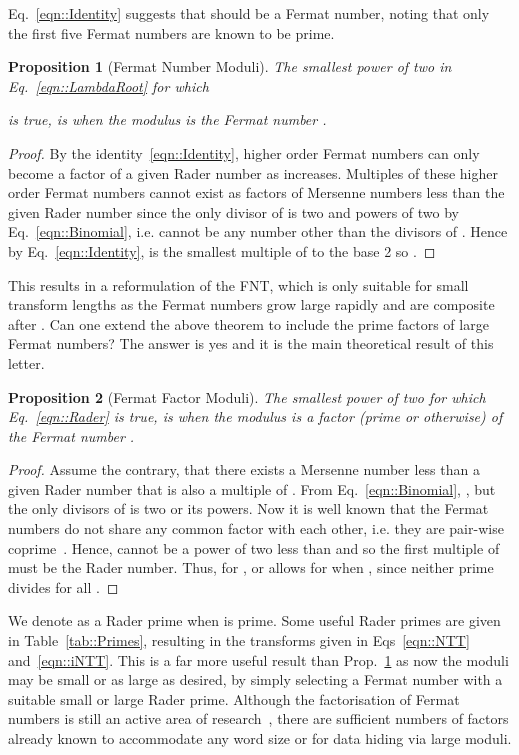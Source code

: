 \documentclass[twocolumn]{IEEEtran}
\newtheorem{theorem}{Proposition}
\newcommand{\eqnTag}{Eq.}
\newcommand{\eqnsTag}{Eqs}
\newcommand{\tabTag}{Table}
\newcommand{\propTag}{Prop.}
\begin{document}
\eqnTag~\eqref{eqn::Identity} suggests that  should be a Fermat number, noting that only the first five Fermat numbers are known to be prime.
\begin{theorem}[Fermat Number Moduli]\label{thm::FermatModuli}
The smallest power of two  in \eqnTag~\eqref{eqn::LambdaRoot} for which

is true, is when the modulus  is the Fermat number .
\end{theorem}
\begin{proof}
By the identity~\eqref{eqn::Identity}, higher order Fermat numbers can only become a factor of a given Rader number as  increases. Multiples of these higher order Fermat numbers cannot exist as factors of Mersenne numbers  less than the given Rader number since the only divisor of  is two and powers of two by \eqnTag~\eqref{eqn::Binomial}, i.e.  cannot be any number other than the divisors of . Hence by \eqnTag~\eqref{eqn::Identity},  is the smallest multiple of  to the base 2 so .
\end{proof}
This results in a reformulation of the \ac{FNT}, which is only suitable for small transform lengths as the Fermat numbers grow large rapidly and are composite after . Can one extend the above theorem to include the prime factors of large Fermat numbers? The answer is yes and it is the main theoretical result of this letter.
\begin{theorem}[Fermat Factor Moduli]\label{thm::FactorModuli}
The smallest power of two  for which \eqnTag~\eqref{eqn::Rader} is true, is when the modulus  is a factor  (prime or otherwise) of the Fermat number .
\end{theorem}
\begin{proof}
Assume the contrary, that there exists a Mersenne number  less than a given Rader number that is also a multiple of . From \eqnTag~\eqref{eqn::Binomial}, , but the only divisors of  is two or its powers. Now it is well known that the Fermat numbers do not share any common factor with each other, i.e. they are pair-wise coprime~\citep[pg. 63]{Schumer2004}. Hence,  cannot be a power of two less than  and so the first multiple of  must be the Rader number. Thus, for ,  or  allows for  when , since neither prime divides  for all .
\end{proof}
We denote  as a Rader prime when  is prime. Some useful Rader primes are given in \tabTag~\ref{tab::Primes}, resulting in the transforms given in \eqnsTag~\eqref{eqn::NTT} and~\eqref{eqn::iNTT}. This is a far more useful result than \propTag~\ref{thm::FermatModuli} as now the moduli may be small or as large as desired, by simply selecting a Fermat number with a suitable small or large Rader prime. Although the factorisation of Fermat numbers is still an active area of research~\citep{Brent1996}, there are sufficient numbers of factors already known to accommodate any word size or for data hiding via large moduli.
\end{document}
